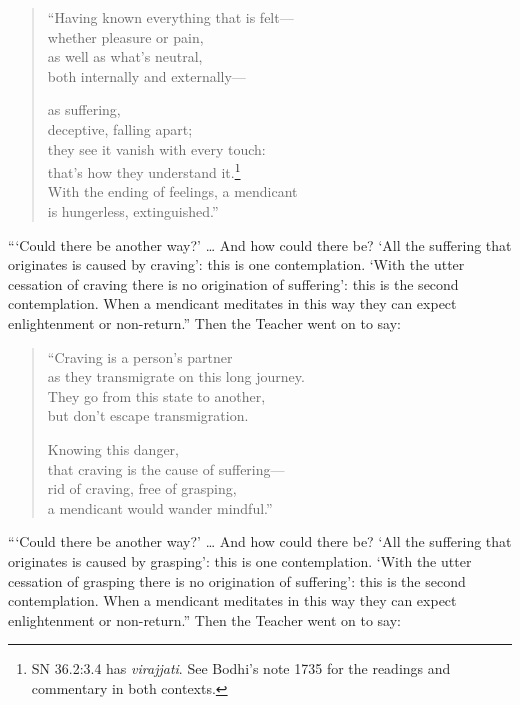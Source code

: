 \documentclass[12pt,openany]{book}%
\begin{document}
\begin{verse}%
“Having known everything that is felt—\\
whether pleasure or pain, \\
as well as what’s neutral, \\
both internally and externally—

as suffering, \\
deceptive, falling apart; \\
they see it vanish with every touch: \\
that’s how they understand it.\footnote{SN 36.2:3.4 has \textit{virajjati}. See Bodhi’s note 1735 for the readings and commentary in both contexts. } \\
With the ending of feelings, a mendicant \\
is hungerless, extinguished.” 

%
\end{verse}

“‘Could there be another way?’ … And how could there be? ‘All the suffering that originates is caused by craving’: this is one contemplation. ‘With the utter cessation of craving there is no origination of suffering’: this is the second contemplation. When a mendicant meditates in this way they can expect enlightenment or non-return.” Then the Teacher went on to say: 

\begin{verse}%
“Craving is a person’s partner \\
as they transmigrate on this long journey. \\
They go from this state to another, \\
but don’t escape transmigration. 

Knowing this danger, \\
that craving is the cause of suffering—\\
rid of craving, free of grasping, \\
a mendicant would wander mindful.” 

%
\end{verse}

“‘Could there be another way?’ … And how could there be? ‘All the suffering that originates is caused by grasping’: this is one contemplation. ‘With the utter cessation of grasping there is no origination of suffering’: this is the second contemplation. When a mendicant meditates in this way they can expect enlightenment or non-return.” Then the Teacher went on to say: 
\end{document}
